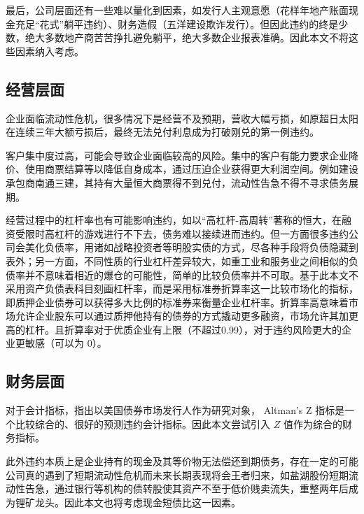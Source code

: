 最后，公司层面还有一些难以量化到因素，如发行人主观意愿（花样年地产账面现金充足“花式”躺平违约）、财务造假（五洋建设欺诈发行）。但因此违约的终是少数，绝大多数地产商苦苦挣扎避免躺平，绝大多数企业报表准确。因此本文不将这些因素纳入考虑。
\subsection{经营层面}
企业面临流动性危机，很多情况下是经营不及预期，营收大幅亏损，如原超日太阳在连续三年大额亏损后，最终无法兑付利息成为打破刚兑的第一例违约。

客户集中度过高，可能会导致企业面临较高的风险\cite{王雄元2017客户集中度与公司债二级市场信用利差}。集中的客户有能力要求企业降价、使用商票结算等以降低自身成本，通过压迫企业获得更大利润空间。例如建设承包商南通三建，其持有大量恒大商票得不到兑付，流动性告急不得不寻求债务展期。

经营过程中的杠杆率也有可能影响违约\cite{王永钦2019杠杆率如何影响资产价格}，如以“高杠杆-高周转”著称的恒大，在融资受限时高杠杆的游戏进行不下去，债务难以接续进而违约。但一方面很多违约公司会美化负债率，用诸如战略投资者等明股实债的方式，尽各种手段将负债隐藏到表外；另一方面，不同性质的行业杠杆差异较大，如重工业和服务业之间相似的负债率并不意味着相近的爆仓的可能性，简单的比较负债率并不可取。基于此本文不采用资产负债表科目刻画杠杆率，而是采用标准券折算率这一比较市场化的指标，即质押企业债券可以获得多大比例的标准券来衡量企业杠杆率。折算率高意味着市场允许企业股东可以通过质押他持有的债券的方式撬动更多融资，市场允许其加更高的杠杆。且折算率对于优质企业有上限（不超过0.99），对于违约风险更大的企业更敏感（可以为 0）。

\subsection{财务层面}
对于会计指标，\Textcite{blochlinger2018ratings}指出以美国债券市场发行人作为研究对象， Altman's Z 指标是一个比较综合的、很好的预测违约会计指标。因此本文尝试引入 \(Z\) 值作为综合的财务指标。

此外违约本质上是企业持有的现金及其等价物无法偿还到期债务，存在一定的可能公司真的遇到了短期流动性危机而未来长期表现将会王者归来，如盐湖股份短期流动性告急，通过银行等机构的债转股使其资产不至于低价贱卖流失，重整两年后成为锂矿龙头。因此本文也将考虑现金短债比这一因素。

